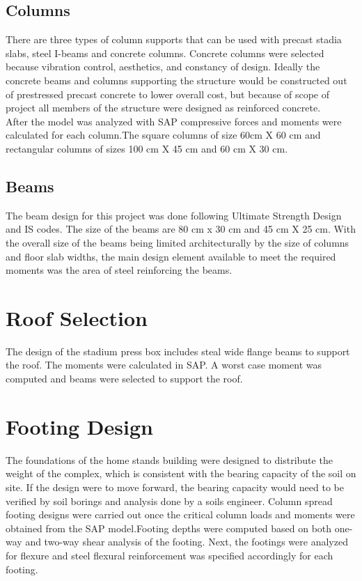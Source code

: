 \subsection{Columns}
There are three types of column supports that can be used with precast stadia slabs, steel I-beams 
and concrete columns. Concrete columns were selected because vibration control, aesthetics, 
and constancy of design. Ideally the concrete beams and columns supporting the structure would 
be constructed out of prestressed precast concrete to lower overall cost, but because of scope of 
project all members of the structure were designed as reinforced concrete.
\\After the model was analyzed with SAP compressive forces and moments were 
calculated for each column.The square columns of size 60cm X 60 cm and rectangular columns of sizes  100 cm X 45 cm and 60 cm X 30 cm.\\
\subsection{Beams}
The beam design for this project was done following Ultimate Strength Design and IS codes. The size of the beams are 80 cm x 30 cm and 45 cm X 25 cm.
With the overall size of the beams being limited architecturally by the size of columns and floor 
slab widths, the main design element available to meet the required moments was the area of steel reinforcing the beams.
\section{Roof Selection}
The design of the stadium press box includes steal wide flange beams to support the roof. The 
moments were calculated in SAP. A worst case moment  was computed 
and beams were selected to support the roof.
\section{Footing Design}
The foundations of the home stands building were designed to distribute the weight of the 
complex, which is consistent with the bearing capacity of the soil on site. If the 
design were to move forward, the bearing capacity would need to be verified by soil borings and 
analysis done by a soils engineer. Column spread footing designs were carried out once the 
critical column loads and moments were obtained from the SAP model.Footing depths were computed based on both one-way and two-way shear 
analysis of the footing. Next, the footings were analyzed for flexure and steel flexural 
reinforcement was specified accordingly for each footing. 

